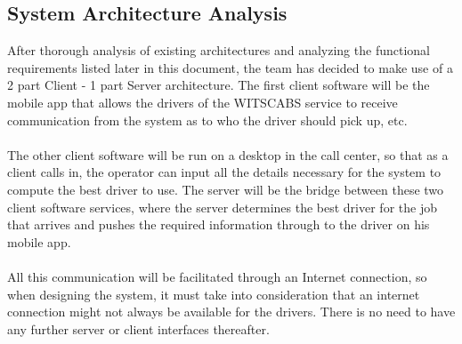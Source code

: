 \documentclass[a4paper,12pt]{article}
\begin{document}
\subsection{System Architecture Analysis}
After thorough analysis of existing architectures and analyzing the functional requirements listed later in this document, the team has decided to make use of a 2 part Client - 1 part Server architecture. The first client software will be the mobile app that allows the drivers of the WITSCABS service to receive communication from the system as to who the driver should pick up, etc. \\\\The other client software will be run on a desktop in the call center, so that as a client calls in, the operator can input all the details necessary for the system to compute the best driver to use. The server will be the bridge between these two client software services, where the server determines the best driver for the job that arrives and pushes the required information through to the driver on his mobile app.\\\\ All this communication will be facilitated through an Internet connection, so when designing the system, it must take into consideration that an internet connection might not always be available for the drivers. There is no need to have any further server or client interfaces thereafter.
\newpage
\end{document}
